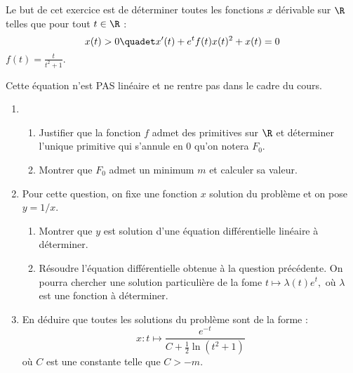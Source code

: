 \documentclass[a4paper, 11pt,reqno]{article}
\begin{document}


\begin{exercice}%
Le but de cet exercice est de déterminer toutes les fonctions $x$ dérivable sur $\R$ telles que pour tout $t\in \R$ : 
$$x(t)>0\quadet x'(t)+e^t f(t)x(t)^2 +x(t) =0$$
 $f(t) =\frac{t}{t^2+1}.$

\warning Cette équation n'est PAS linéaire et ne rentre pas dans le cadre du cours. 
\begin{enumerate}
\item \begin{enumerate}
\item Justifier que la fonction $f$ admet des primitives sur $\R$ et déterminer l'unique primitive qui s'annule en $0$ qu'on notera $F_0$. 
\item Montrer que $F_0$ admet un minimum $m$ et calculer sa valeur. 
\end{enumerate}
\item  Pour cette question, on fixe une fonction $x$ solution du problème et on pose $y=1/x$.
\begin{enumerate}
\item Montrer que $y$ est solution d'une équation différentielle linéaire à déterminer. 
\item Résoudre l'équation différentielle obtenue à la question précédente. On pourra chercher une solution particulière de la fome $t\mapsto \lambda(t) e^{t},  $ où $\lambda$ est une fonction à déterminer. 
\end{enumerate}
\item En déduire que toutes les solutions du problème sont de la forme : 
$$x : t \mapsto \frac{e^{-t}}{ C +\frac{1}{2} \ln(t^2+1) }$$
où $C$ est une constante telle que $C>-m$.
\end{enumerate}
\end{exercice}
\end{document}
